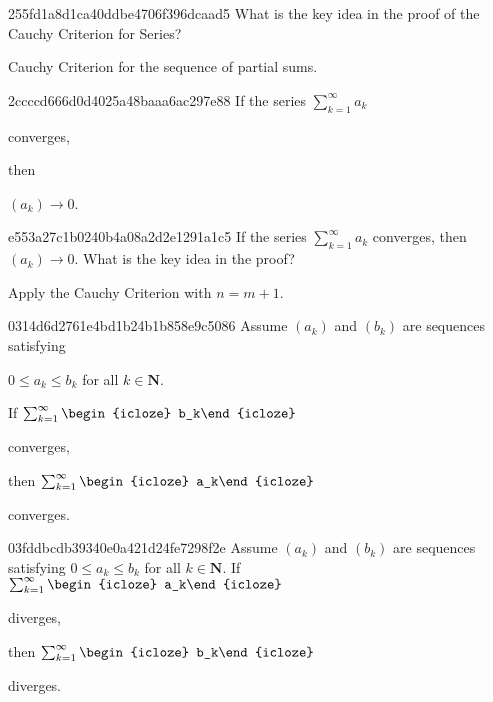 \begin{note}{255fd1a8d1ca40ddbe4706f396dcaad5}
    What is the key idea in the proof of the Cauchy Criterion for Series?

    \begin{cloze}{1}
        Cauchy Criterion for the sequence of partial sums.
    \end{cloze}
\end{note}

\begin{note}{2ccccd666d0d4025a48baaa6ac297e88}
    If the series \({ \sum_{k=1}^{\infty} a_k }\) \begin{icloze}{2}converges,\end{icloze} then \begin{icloze}{1}\({ (a_k) \to 0 }\).\end{icloze}
\end{note}

\begin{note}{e553a27c1b0240b4a08a2d2e1291a1c5}
    If the series \({ \sum_{k=1}^{\infty} a_k }\) converges, then \({ (a_k) \to 0 }\).
    What is the key idea in the proof?

    \begin{cloze}{1}
        Apply the Cauchy Criterion with \({ n = m + 1 }\).
    \end{cloze}
\end{note}

\begin{note}{0314d6d2761e4bd1b24b1b858e9c5086}
    Assume \({ (a_k) }\) and \({ (b_k) }\) are sequences satisfying \begin{icloze}{3}\({ 0 \leq a_k \leq b_k }\) for all \({ k \in \mathbf{N} }\).\end{icloze}
    If \({ \sum_{k=1}^{\infty} \begin{icloze}{1}b_k\end{icloze} }\) \begin{icloze}{2}converges,\end{icloze} then \({ \sum_{k=1}^{\infty} \begin{icloze}{1}a_k\end{icloze} }\) \begin{icloze}{2}converges.\end{icloze}
\end{note}

\begin{note}{03fddbcdb39340e0a421d24fe7298f2e}
    Assume \({ (a_k) }\) and \({ (b_k) }\) are sequences satisfying \({ 0 \leq a_k \leq b_k }\) for all \({ k \in \mathbf{N} }\).
    If \({ \sum_{k=1}^{\infty} \begin{icloze}{1}a_k\end{icloze} }\) \begin{icloze}{2}diverges,\end{icloze} then \({ \sum_{k=1}^{\infty} \begin{icloze}{1}b_k\end{icloze} }\) \begin{icloze}{2}diverges.\end{icloze}
\end{note}

